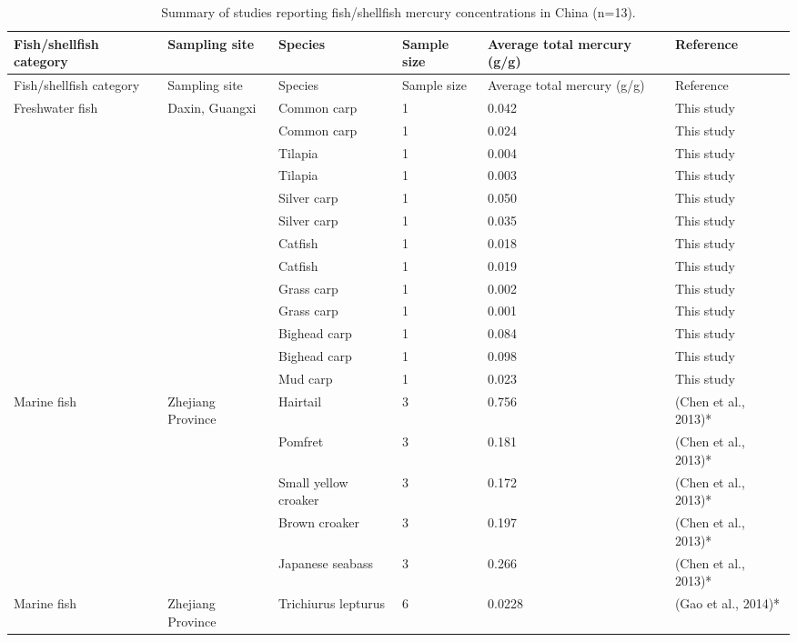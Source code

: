 \begin{center}
\tiny
\begin{longtable}{ | p{2cm} | p{1.4cm} | p{3cm} | p{1.6cm} | p{1.9cm} | p{2.6cm} | }
\caption[Summary of studies in China]{Summary of studies reporting fish/shellfish mercury concentrations in China (n=13).}
\label{epid_studies} \\
\hline
    Fish/shellfish category & Sampling site & Species & Sample size & Average total mercury (g/g) & Reference  \\ \hline
        \endfirsthead
\hline
    Fish/shellfish category & Sampling site & Species & Sample size & Average total mercury (g/g) & Reference  \\ \hline
    \endhead

Freshwater fish & Daxin, Guangxi & Common carp & 1 & 0.042 & This study  \\ \hline
 &  & Common carp & 1 & 0.024 & This study  \\ \hline
 &  & Tilapia & 1 & 0.004 & This study  \\ \hline
 &  & Tilapia & 1 & 0.003 & This study  \\ \hline
 &  & Silver carp & 1 & 0.050 & This study  \\ \hline
 &  & Silver carp & 1 & 0.035 & This study  \\ \hline
 &  & Catfish & 1 & 0.018 & This study  \\ \hline
 &  & Catfish & 1 & 0.019 & This study  \\ \hline
 &  & Grass carp & 1 & 0.002 & This study  \\ \hline
 &  & Grass carp & 1 & 0.001 & This study  \\ \hline
 &  & Bighead carp & 1 & 0.084 & This study  \\ \hline
 &  & Bighead carp & 1 & 0.098 & This study  \\ \hline
 &  & Mud carp & 1 & 0.023 & This study  \\ \hline
Marine fish & Zhejiang Province & Hairtail & 3 & 0.756 & (Chen et al., 2013)*  \\ \hline
 &  & Pomfret & 3 & 0.181 & (Chen et al., 2013)*  \\ \hline
 &  & Small yellow croaker & 3 & 0.172 & (Chen et al., 2013)*  \\ \hline
 &  & Brown croaker & 3 & 0.197 & (Chen et al., 2013)*  \\ \hline
 &  & Japanese seabass & 3 & 0.266 & (Chen et al., 2013)*  \\ \hline
Marine fish & Zhejiang Province & Trichiurus lepturus & 6 & 0.0228 & (Gao et al., 2014)*  \\ \hline

\end{longtable}
\end{center}
